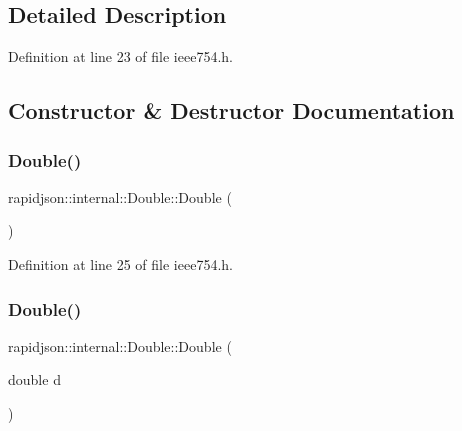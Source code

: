 \subsection{Detailed Description}


Definition at line 23 of file ieee754.\+h.



\subsection{Constructor \& Destructor Documentation}
\mbox{\label{classrapidjson_1_1internal_1_1_double_a6a806fb33921f079eac494f82aa041f7}} 
\subsubsection{\texorpdfstring{Double()}{Double()}\hspace{0.1cm}{\footnotesize\ttfamily [1/3]}}
{\footnotesize\ttfamily rapidjson\+::internal\+::\+Double\+::\+Double (\begin{DoxyParamCaption}{ }\end{DoxyParamCaption})}



Definition at line 25 of file ieee754.\+h.


\begin{DoxyCode}{0}

\end{DoxyCode}
\mbox{\label{classrapidjson_1_1internal_1_1_double_a7b18d4e93fd0bae8fcbc1fedf95c4edb}} 
\subsubsection{\texorpdfstring{Double()}{Double()}\hspace{0.1cm}{\footnotesize\ttfamily [2/3]}}
{\footnotesize\ttfamily rapidjson\+::internal\+::\+Double\+::\+Double (\begin{DoxyParamCaption}\item[{double}]{d }\end{DoxyParamCaption})}



